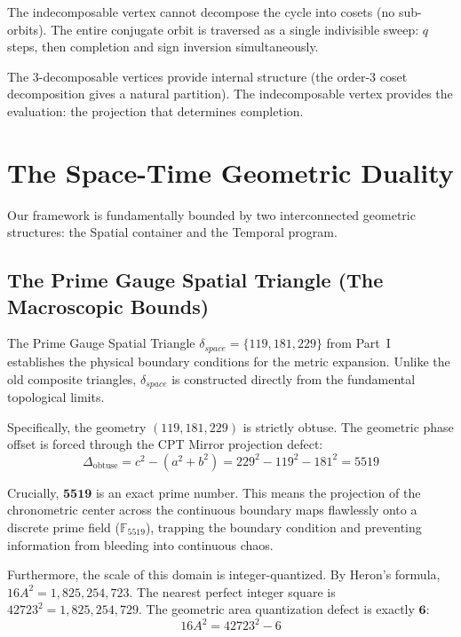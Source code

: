 The indecomposable vertex cannot decompose the cycle into cosets
(no sub-orbits). The entire conjugate orbit is traversed as a single
indivisible sweep: $q$ steps, then completion and sign inversion
simultaneously.

The 3-decomposable vertices provide internal structure (the
order-3 coset decomposition gives a natural partition). The
indecomposable vertex provides the evaluation: the projection
that determines completion.

\section{The Space-Time Geometric Duality}
\label{sec:chrono}

Our framework is fundamentally bounded by two interconnected geometric structures: the Spatial container and the Temporal program.

\subsection{The Prime Gauge Spatial Triangle (The Macroscopic Bounds)}
The Prime Gauge Spatial Triangle $\delta_{space} = \{119, 181, 229\}$ 
from Part~I~\cite{dwm_fst} establishes the physical boundary conditions for the metric expansion. Unlike the old composite triangles, $\delta_{space}$ is constructed directly from the fundamental topological limits.

Specifically, the geometry $(119, 181, 229)$ is strictly obtuse. The geometric phase offset is forced through the CPT Mirror projection defect:
\begin{equation}
\Delta_{\text{obtuse}} = c^2 - (a^2 + b^2) = 229^2 - 119^2 - 181^2 = 5519
\end{equation}

Crucially, $\mathbf{5519}$ is an exact prime number. This means the projection of the chronometric center across the continuous boundary maps flawlessly onto a discrete prime field ($\mathbb{F}_{5519}$), trapping the boundary condition and preventing information from bleeding into continuous chaos.

Furthermore, the scale of this domain is integer-quantized. By Heron's formula, $16A^2 = 1,825,254,723$. The nearest perfect integer square is $42723^2 = 1,825,254,729$. The geometric area quantization defect is exactly $\mathbf{6}$:
\begin{equation}
16 A^2 = 42723^2 - 6
\end{equation}

